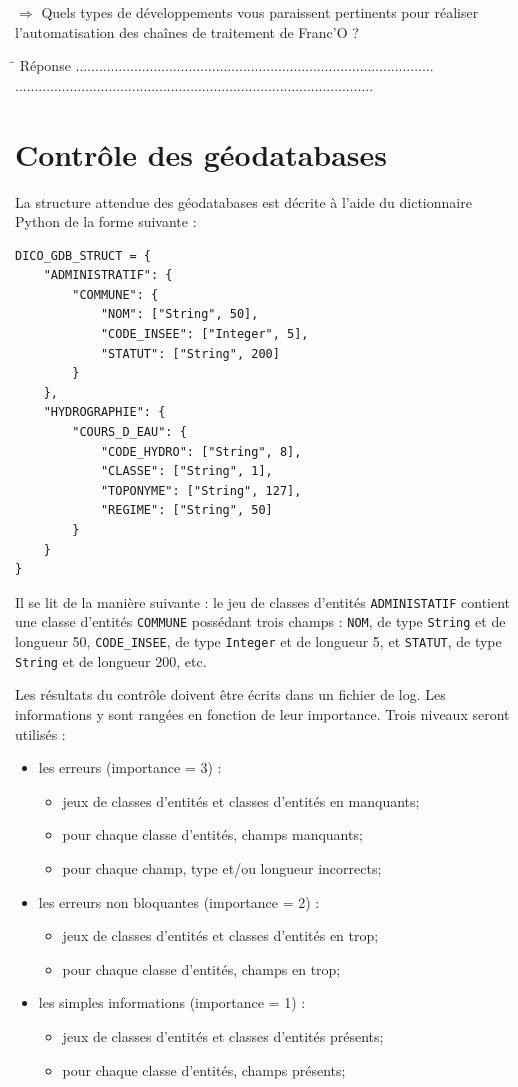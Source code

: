 \documentclass[11pt]{article}
\newcommand{\action}{$\Rightarrow$ }
\newcommand{\reponse}{
	\begin{tabbing}
	\hspace{2cm}\=\kill
	Réponse \> ............................................................................................ \\ 
 	\> ............................................................................................
	\end{tabbing}
}
\newcommand{\code}[1]{\lstinline{#1}}
\begin{document}
\action Quels types de développements vous paraissent pertinents pour réaliser l'automatisation des chaînes de traitement de Franc'O ?

\reponse


\section{Contrôle des géodatabases}

La structure attendue des géodatabases est décrite à l'aide du dictionnaire Python de la forme suivante :
\begin{lstlisting}
DICO_GDB_STRUCT = {
    "ADMINISTRATIF": {
        "COMMUNE": {
            "NOM": ["String", 50],
            "CODE_INSEE": ["Integer", 5],
            "STATUT": ["String", 200]
        }
    },
    "HYDROGRAPHIE": {
        "COURS_D_EAU": {
            "CODE_HYDRO": ["String", 8],
            "CLASSE": ["String", 1],
            "TOPONYME": ["String", 127],
            "REGIME": ["String", 50]
        }
    }
}
\end{lstlisting}

Il se lit de la manière suivante : le jeu de classes d'entités \code{ADMINISTATIF} contient une classe d'entités \code{COMMUNE} possédant trois champs : \code{NOM}, de type \code{String} et de longueur 50,   \code{CODE_INSEE}, de type \code{Integer} et de longueur 5, et \code{STATUT}, de type \code{String} et de longueur 200, etc.

Les résultats du contrôle doivent être écrits dans un fichier de log. Les informations y sont rangées en fonction de leur importance. Trois niveaux seront utilisés :
\begin{itemize}
	\item les erreurs (importance = 3) :
	\begin{itemize}
		\item jeux de classes d'entités et classes d'entités en manquants;
		\item pour chaque classe d'entités, champs manquants;
		\item pour chaque champ, type et/ou longueur incorrects;
	\end{itemize}
	\item les erreurs non bloquantes (importance = 2) :
	\begin{itemize}
		\item jeux de classes d'entités et classes d'entités en trop;
		\item pour chaque classe d'entités, champs en trop;
	\end{itemize}
	\item les simples informations (importance = 1) :
	\begin{itemize}
		\item jeux de classes d'entités et classes d'entités présents;
		\item pour chaque classe d'entités, champs présents;
	\end{itemize}
\end{itemize}
\end{document}

